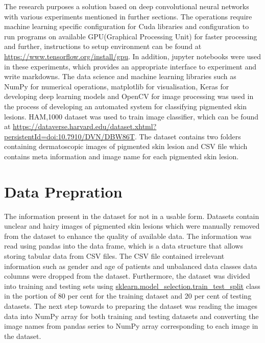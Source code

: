 The research purposes a solution based on deep convolutional neural networks with various experiments mentioned in further sections. The operations require machine learning specific configuration for Cuda libraries and configuration to run programs on available GPU(Graphical Processing Unit) for faster processing and further, instructions to setup environment can be found at \url{https://www.tensorflow.org/install/gpu}. In addition, jupyter notebooks were used in these experiments, which provides an appropriate interface to experiment and write markdowns. The data science and machine learning libraries such as NumPy for numerical operations, matplotlib for visualisation, Keras for developing deep learning models and OpenCV for image processing was used in the process of developing an automated system for classifying pigmented skin lesions. HAM,1000 dataset was used to train image classifier, which can be found at
\url{https://dataverse.harvard.edu/dataset.xhtml?persistentId=doi:10.7910/DVN/DBW86T}. The dataset contains two folders containing dermatoscopic images of pigmented skin lesion and CSV file which contains meta information and image name for each pigmented skin lesion.

\section*{Data Prepration}
The information present in the dataset for not in a usable form. Datasets contain unclear and hairy images of pigmented skin lesions which were manually removed from the dataset to enhance the quality of available data. The information was read using pandas into the data frame, which is a data structure that allows storing tabular data from CSV files. The CSV file contained irrelevant information such as gender and age of patients and unbalanced data classes data columns were dropped from the dataset. Furthermore, the dataset was divided into training and testing sets using \url{sklearn.model_selection.train_test_split} class in the portion of 80 per cent for the training dataset and 20 per cent of testing datasets. The next step towards to preparing the dataset was reading the images data into NumPy array for both training and testing datasets and converting the image names from pandas series to NumPy array corresponding to each image in the dataset.